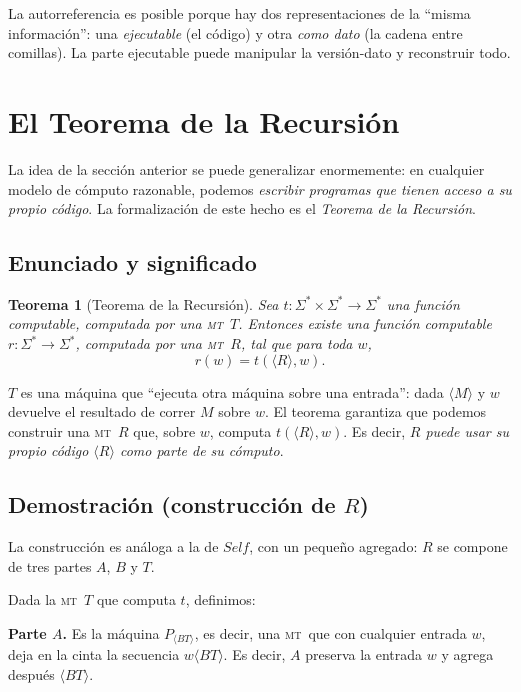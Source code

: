\documentclass[11pt,a4paper]{article}
\theoremstyle{definicion}
\newtheorem{teorema}[definicion]{Teorema}
\newcommand{\MT}{\textsc{mt}}
\newcommand{\enc}[1]{\langle #1 \rangle}
\begin{document}
\begin{idea}
La autorreferencia es posible porque hay dos representaciones de la ``misma información'': una \emph{ejecutable} (el código) y otra \emph{como dato} (la cadena entre comillas). La parte ejecutable puede manipular la versión-dato y reconstruir todo.
\end{idea}

\section{El Teorema de la Recursión}

La idea de la sección anterior se puede generalizar enormemente: en cualquier modelo de cómputo razonable, podemos \emph{escribir programas que tienen acceso a su propio código}. La formalización de este hecho es el \emph{Teorema de la Recursión}.

\subsection{Enunciado y significado}

\begin{teorema}[Teorema de la Recursión]\label{teo:recursion}
Sea $t : \Sigma^* \times \Sigma^* \to \Sigma^*$ una función computable, computada por una \MT\ $T$. Entonces existe una función computable $r : \Sigma^* \to \Sigma^*$, computada por una \MT\ $R$, tal que para toda $w$,
\[
r(w) = t(\enc{R}, w).
\]
\end{teorema}

\begin{intuicion}
$T$ es una máquina que ``ejecuta otra máquina sobre una entrada'': dada $\enc{M}$ y $w$ devuelve el resultado de correr $M$ sobre $w$. El teorema garantiza que podemos construir una \MT\ $R$ que, sobre $w$, computa $t(\enc{R}, w)$. Es decir, \emph{$R$ puede usar su propio código $\enc{R}$ como parte de su cómputo}.
\end{intuicion}

\subsection{Demostración (construcción de $R$)}

La construcción es análoga a la de $\mathit{Self}$, con un pequeño agregado: $R$ se compone de tres partes $A$, $B$ y $T$.

Dada la \MT\ $T$ que computa $t$, definimos:

\textbf{Parte $A$.} Es la máquina $P_{\enc{BT}}$, es decir, una \MT\ que con cualquier entrada $w$, deja en la cinta la secuencia $w\enc{BT}$. Es decir, $A$ preserva la entrada $w$ y agrega después $\enc{BT}$.
\end{document}
